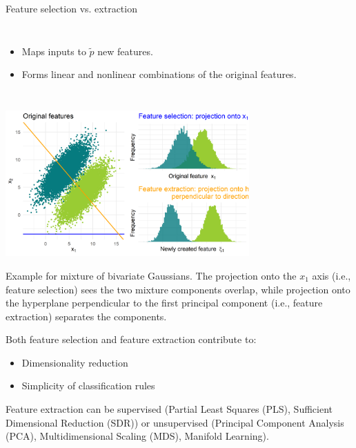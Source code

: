 \documentclass[11pt,compress,t,notes=noshow, xcolor=table]{beamer}
\begin{document}
\begin{vbframe}{Feature selection vs. extraction}
\begin{columns}
      \smallskip

      \begin{itemize}
        \item Maps inputs to $\tilde{p}$ new features.
        \item Forms linear and nonlinear combinations of the original features.
      \end{itemize}

    \end{columns}


    \framebreak

    \begin{center}
     \includegraphics[width = 0.7\textwidth]{figure_man/feature_sel_vs_extr.png}
    \end{center}

    \footnotesize{Example for mixture of bivariate Gaussians. The projection onto the $x_1$ axis (i.e., feature selection) sees the two mixture components overlap, while projection onto the hyperplane perpendicular to the first principal component (i.e., feature extraction) separates the components.}

    \normalsize

    \framebreak

    Both feature selection and feature extraction contribute to:

    \begin{itemize}
      \item Dimensionality reduction
      \item Simplicity of classification rules
    \end{itemize}

    Feature extraction can be supervised (Partial Least Squares (PLS), Sufficient Dimensional Reduction (SDR)) or unsupervised (Principal Component Analysis (PCA), Multidimensional Scaling (MDS), Manifold Learning).

  \end{vbframe}
\end{document}
